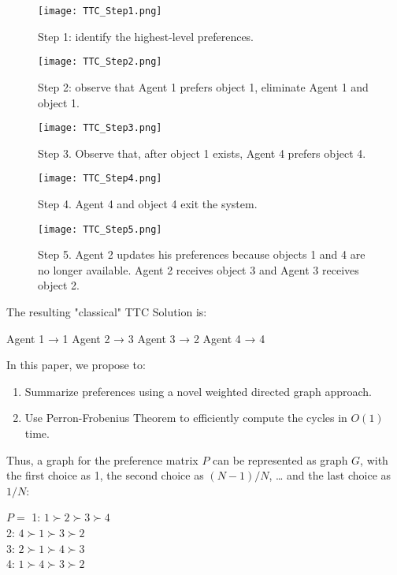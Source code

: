 \begin{figure}
    \centering
    \texttt{[image: TTC\_Step1.png]}
    \caption{Step 1: identify the highest-level preferences. }
    \label{fig:enter-label}
\end{figure}

\begin{figure}
    \centering
    \texttt{[image: TTC\_Step2.png]}
    \caption{Step 2: observe that Agent 1 prefers object 1, eliminate Agent 1 and object 1.}
    \label{fig:enter-label}
\end{figure}

\begin{figure}
    \centering
    \texttt{[image: TTC\_Step3.png]}
    \caption{Step 3. Observe that, after object 1 exists, Agent 4 prefers object 4. }
    \label{fig:enter-label}
\end{figure}

\begin{figure}
    \centering
    \texttt{[image: TTC\_Step4.png]}
    \caption{Step 4. Agent 4 and object 4 exit the system. }
    \label{fig:enter-label}
\end{figure}

\begin{figure}
    \centering
    \texttt{[image: TTC\_Step5.png]}
    \caption{Step 5. Agent 2 updates his preferences because objects 1 and 4 are no longer available. Agent 2 receives object 3 and Agent 3 receives object 2. }
    \label{fig:enter-label}
\end{figure}


The resulting "classical" TTC Solution is:

Agent 1 → 1
Agent 2 → 3
Agent 3 → 2
Agent 4 → 4


In this paper, we propose to:
\begin{enumerate}
    \item Summarize preferences using a novel weighted directed graph approach.
    \item Use Perron-Frobenius Theorem to efficiently compute the cycles in $O(1)$ time.
\end{enumerate}

Thus, a graph for the preference matrix $P$ can be represented as graph $G$, with the first choice as 1, the second choice as $(N-1)/N$, … and the last choice as $1/N$:

$P =$
        1: $1\succ 2\succ 3\succ 4$ \\
 	2: $4\succ 1\succ 3\succ 2$ \\
 	3: $2\succ 1\succ 4\succ 3$ \\
 	4: $1\succ 4\succ 3\succ 2$
    
